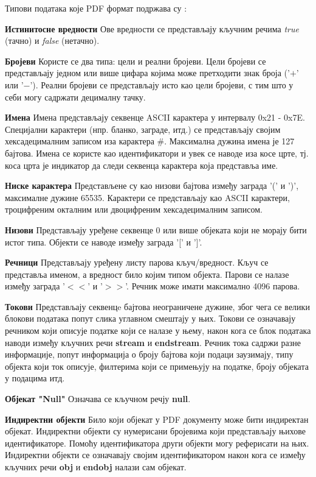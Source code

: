 \documentclass[12pt,oneside]{memoir}
\begin{document}
Типови података које PDF формат подржава су \cite{PDFDoc, introToPdf, basicStrPdf}:
\begin{description}
\item \textbf{Истинитосне вредности} Ове вредности се представљају кључним речима \textit{true} (тачно) и \textit{false} (нетачно).
\item \textbf{Бројеви} Користе се два типа: цели и реални бројеви. Цели бројеви се представљају једном или више цифара којима може претходити знак броја ('$+$' или '$-$'). Реални бројеви се представљају исто као цели бројеви, с тим што у себи могу садржати децималну тачку.
\item \textbf{Имена} Имена представљају секвенце ASCII карактера у интервалу 0x21 - 0x7E. Специјални карактери (нпр. бланко, заграде, итд.) се представљају својим хексадецималним записом иза карактера $\#$. Максимална дужина имена је 127 бајтова. Имена се користе као идентификатори и увек се наводе иза косе црте, тј. коса црта је индикатор да следи секвенца карактера која представља име.
\item \textbf{Ниске карактера} Представљене су као низови бајтова између заграда '(' и ')', максималне дужине 65535. Карактери се представљају као ASCII карактери, троцифреним окталним или двоцифреним хексадецималним записом. 
\item \textbf{Низови} Представљају уређене секвенце 0 или више објеката који не морају бити истог типа. Објекти се наводе између заграда '[' и ']'.
\item \textbf{Речници} Представљају уређену листу парова кључ/вредност. Кључ се представља именом, а вредност било којим типом објекта. Парови се налазе између заграда '$<<$' и '$>>$'. Речник може имати максимално 4096 парова. 
\item \textbf{Токови} Представљају секвенцe бајтова неограничене дужине, због чега се велики блокови података попут слика углавном смештају у њих. Токови се означавају речником који описује податке који се налазе у њему, након кога се блок података наводи између кључних речи \textbf{stream} и \textbf{endstream}. Речник тока садржи разне информације, попут информација о броју бајтова који подаци заузимају, типу објекта који ток описује, филтерима који се примењују на податке, броју објеката у подацима итд.
\item \textbf{Објекат "Null"} Означава се кључном речју \textbf{null}.
\item \textbf{Индиректни објекти} Било који објекат у PDF документу може бити индиректан објекат. Индиректни објекти су нумерисани бројевима који представљају њихове идентификаторе. Помоћу идентификатора други објекти могу реферисати на њих. Индиректни објекти се означавају својим идентификатором након кога се између кључних речи \textbf{obj} и \textbf{endobj} налази сам објекат. 
\end{description} 
\end{document}
